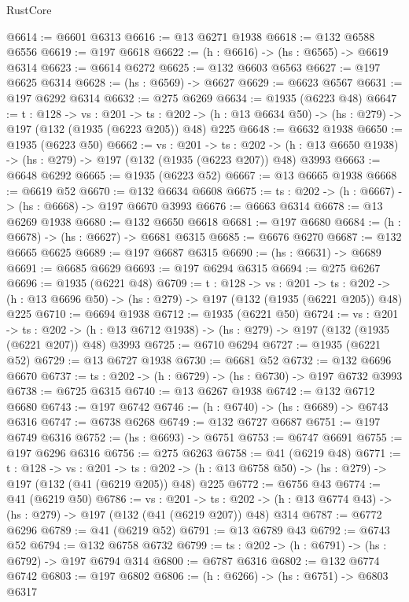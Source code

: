 \begin{lexlean}{RustCore}
\begin{coremodule}
@6614 := @6601 @6313
@6616 := @13 @6271 @1938
@6618 := @132 @6588 @6556
@6619 := @197 @6618
@6622 := (h : @6616) -> (hs : @6565) -> @6619 @6314
@6623 := @6614 @6272
@6625 := @132 @6603 @6563
@6627 := @197 @6625 @6314
@6628 := (hs : @6569) -> @6627
@6629 := @6623 @6567
@6631 := @197 @6292 @6314
@6632 := @275 @6269
@6634 := @1935 (@6223 @48)
@6647 := {t : @128} ->
  {vs : @201} ->
  {ts : @202} -> (h : @13 @6634 @50) -> (hs : @279) -> @197 (@132 (@1935 (@6223 @205)) @48) @225
@6648 := @6632 @1938
@6650 := @1935 (@6223 @50)
@6662 := {vs : @201} ->
  {ts : @202} -> (h : @13 @6650 @1938) -> (hs : @279) -> @197 (@132 (@1935 (@6223 @207)) @48) @3993
@6663 := @6648 @6292
@6665 := @1935 (@6223 @52)
@6667 := @13 @6665 @1938
@6668 := @6619 @52
@6670 := @132 @6634 @6608
@6675 := {ts : @202} -> (h : @6667) -> (hs : @6668) -> @197 @6670 @3993
@6676 := @6663 @6314
@6678 := @13 @6269 @1938
@6680 := @132 @6650 @6618
@6681 := @197 @6680
@6684 := (h : @6678) -> (hs : @6627) -> @6681 @6315
@6685 := @6676 @6270
@6687 := @132 @6665 @6625
@6689 := @197 @6687 @6315
@6690 := (hs : @6631) -> @6689
@6691 := @6685 @6629
@6693 := @197 @6294 @6315
@6694 := @275 @6267
@6696 := @1935 (@6221 @48)
@6709 := {t : @128} ->
  {vs : @201} ->
  {ts : @202} -> (h : @13 @6696 @50) -> (hs : @279) -> @197 (@132 (@1935 (@6221 @205)) @48) @225
@6710 := @6694 @1938
@6712 := @1935 (@6221 @50)
@6724 := {vs : @201} ->
  {ts : @202} -> (h : @13 @6712 @1938) -> (hs : @279) -> @197 (@132 (@1935 (@6221 @207)) @48) @3993
@6725 := @6710 @6294
@6727 := @1935 (@6221 @52)
@6729 := @13 @6727 @1938
@6730 := @6681 @52
@6732 := @132 @6696 @6670
@6737 := {ts : @202} -> (h : @6729) -> (hs : @6730) -> @197 @6732 @3993
@6738 := @6725 @6315
@6740 := @13 @6267 @1938
@6742 := @132 @6712 @6680
@6743 := @197 @6742
@6746 := (h : @6740) -> (hs : @6689) -> @6743 @6316
@6747 := @6738 @6268
@6749 := @132 @6727 @6687
@6751 := @197 @6749 @6316
@6752 := (hs : @6693) -> @6751
@6753 := @6747 @6691
@6755 := @197 @6296 @6316
@6756 := @275 @6263
@6758 := @41 (@6219 @48)
@6771 := {t : @128} ->
  {vs : @201} ->
  {ts : @202} -> (h : @13 @6758 @50) -> (hs : @279) -> @197 (@132 (@41 (@6219 @205)) @48) @225
@6772 := @6756 @43
@6774 := @41 (@6219 @50)
@6786 := {vs : @201} ->
  {ts : @202} -> (h : @13 @6774 @43) -> (hs : @279) -> @197 (@132 (@41 (@6219 @207)) @48) @314
@6787 := @6772 @6296
@6789 := @41 (@6219 @52)
@6791 := @13 @6789 @43
@6792 := @6743 @52
@6794 := @132 @6758 @6732
@6799 := {ts : @202} -> (h : @6791) -> (hs : @6792) -> @197 @6794 @314
@6800 := @6787 @6316
@6802 := @132 @6774 @6742
@6803 := @197 @6802
@6806 := (h : @6266) -> (hs : @6751) -> @6803 @6317

\end{coremodule}
\end{lexlean}
